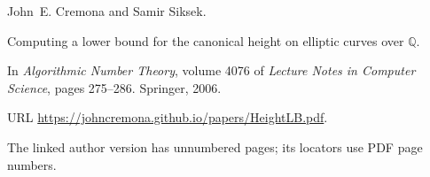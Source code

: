 John~E. Cremona and Samir Siksek.

\newblock Computing a lower bound for the canonical height on elliptic curves
  over {$\mathbb Q$}.

\newblock In \emph{Algorithmic Number Theory}, volume 4076 of \emph{Lecture
  Notes in Computer Science}, pages 275--286. Springer, 2006.

\newblock URL \url{https://johncremona.github.io/papers/HeightLB.pdf}.

\newblock The linked author version has unnumbered pages; its locators use PDF page numbers.
